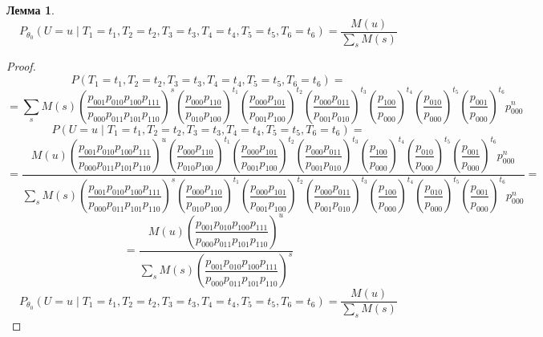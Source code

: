 \documentclass{article}
\theoremstyle{definition}
\newtheorem{lemma}{Лемма}[section]
\begin{document}
\begin{lemma}
    $$P_{\theta_0}(U=u \mid T_1=t_1, T_2=t_2, T_3=t_3, T_4=t_4, T_5=t_5, T_6=t_6)=\dfrac{M(u)}{\sum_{s} M(s)}$$
\end{lemma}
\begin{proof}
    $$P(T_1=t_1, T_2=t_2, T_3=t_3, T_4=t_4, T_5=t_5, T_6=t_6)=$$
    $$=\sum_{s} M(s) \left(\dfrac{p_{001}p_{010}p_{100}p_{111}}{p_{000}p_{011}p_{101}p_{110}}\right)^s
        \left(\dfrac{p_{000} p_{110}}{p_{010} p_{100}}\right)^{t_1}\left(\dfrac{p_{000}p_{101}}{p_{001}p_{100}}\right)^{t_2}
        \left(\dfrac{p_{000}p_{011}}{p_{001}p_{010}}\right)^{t_3}\left(\dfrac{p_{100}}{p_{000}}\right)^{t_4}
        \left(\dfrac{p_{010}}{p_{000}}\right)^{t_5} \left(\dfrac{p_{001}}{p_{000}}\right)^{t_6} p_{000}^n$$
    $$P(U=u \mid T_1=t_1, T_2=t_2, T_3=t_3, T_4=t_4, T_5=t_5, T_6=t_6)=$$
    $$=\dfrac{M(u) \left(\dfrac{p_{001}p_{010}p_{100}p_{111}}{p_{000}p_{011}p_{101}p_{110}}\right)^u
            \left(\dfrac{p_{000} p_{110}}{p_{010} p_{100}}\right)^{t_1}\left(\dfrac{p_{000}p_{101}}{p_{001}p_{100}}\right)^{t_2}
            \left(\dfrac{p_{000}p_{011}}{p_{001}p_{010}}\right)^{t_3}\left(\dfrac{p_{100}}{p_{000}}\right)^{t_4}
            \left(\dfrac{p_{010}}{p_{000}}\right)^{t_5} \left(\dfrac{p_{001}}{p_{000}}\right)^{t_6} p_{000}^n}{\sum_{s} M(s) \left(\dfrac{p_{001}p_{010}p_{100}p_{111}}{p_{000}p_{011}p_{101}p_{110}}\right)^s
            \left(\dfrac{p_{000} p_{110}}{p_{010} p_{100}}\right)^{t_1}\left(\dfrac{p_{000}p_{101}}{p_{001}p_{100}}\right)^{t_2}
            \left(\dfrac{p_{000}p_{011}}{p_{001}p_{010}}\right)^{t_3}\left(\dfrac{p_{100}}{p_{000}}\right)^{t_4}
            \left(\dfrac{p_{010}}{p_{000}}\right)^{t_5} \left(\dfrac{p_{001}}{p_{000}}\right)^{t_6} p_{000}^n}=$$
    $$=\dfrac{M(u) \left(\dfrac{p_{001}p_{010}p_{100}p_{111}}{p_{000}p_{011}p_{101}p_{110}}\right)^u}
        {\sum_{s} M(s) \left(\dfrac{p_{001}p_{010}p_{100}p_{111}}{p_{000}p_{011}p_{101}p_{110}}\right)^s}$$
        $$P_{\theta_0}(U=u \mid T_1=t_1, T_2=t_2, T_3=t_3, T_4=t_4, T_5=t_5, T_6=t_6)=\dfrac{M(u)}{\sum_{s} M(s)}$$
\end{proof}
\end{document}

